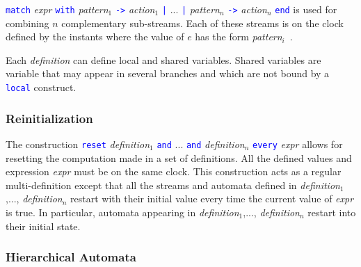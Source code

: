 \documentclass[11pt,titlepage,twoside]{report}
\newcommand{\AND}{\mbox{{\tt and}}}
\renewcommand{\Reset}{\mbox{{\tt reset}}}
\newcommand{\Every}{\mbox{{\tt every}}}
\newcommand{\term}[1]{\textcolor{Blue}{\tt #1}}
\newcommand{\nterm}[1]{\textcolor{BrickRed}{\it #1}}
\newcommand{\term}[1]{{\tt #1}}
\newcommand{\nterm}[1]{{\em #1}}
\begin{document}
\term{match} \nterm{expr} \term{with} \nterm{pattern}$_1$ \term{->}
\nterm{action}$_1$ \term{|} ... \term{|} \nterm{pattern}$_n$ \term{->}
\nterm{action}$_n$ \term{end} is used for combining $n$ complementary
sub-streams. Each of these streams is on the clock defined by the
instants where the value of $e$ has the form \nterm{pattern}$_i$\ .

Each \nterm{definition} can define local and shared variables.
Shared variables are variable that may appear in several branches and
which are not bound by a \term{local} construct.

\subsubsection{Reinitialization}

The construction \term{\Reset} \nterm{definition}$_1$ \term{\AND} ...
\term{\AND} \nterm{definition}$_n$ \term{\Every} \nterm{expr} allows
for resetting the computation made in a set of definitions. All the
defined values and expression \nterm{expr} must be on the same
clock. This construction acts as a regular multi-definition except
that all the streams and automata defined in
\nterm{definition}$_1$,..., \nterm{definition}$_n$ restart with their
initial value every time the current value of {\em expr} is true. In
particular, automata appearing in \nterm{definition}$_1$,...,
\nterm{definition}$_n$ restart into their initial state.

\subsubsection{Hierarchical Automata}
\end{document}
